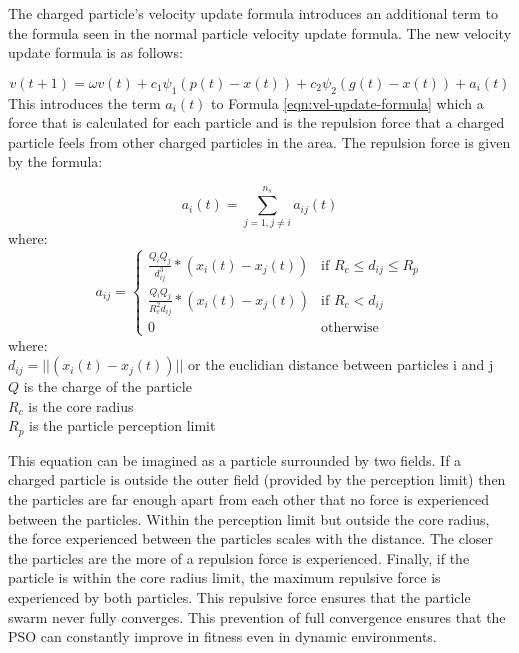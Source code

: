 The charged particle's velocity update formula introduces an additional term to the formula seen in the normal particle velocity update formula. The new velocity update formula is as follows:

\begin{equation} \label{eqn:charged-vel-update}
 v(t+1) = \omega v(t) + c_1\psi_1 (p(t) - x(t)) + c_2 \psi_2  (g(t) - x(t)) + a_i(t)
\end{equation} This introduces the term $a_i(t)$ to Formula \ref{eqn:vel-update-formula} which a force that is calculated for each particle and is the repulsion force that a charged particle feels from other charged particles in the area. The repulsion force is given by the formula:

\begin{equation} \label{eqn:a-def}
 a_i(t) = \sum_{j=1, j\neq i}^{n_s} a_{ij}(t)
\end{equation}where:
 \begin{equation}\label{eq:a-rules}
a_{ij} = 
    \begin{cases}  
    \frac{Q_{i}Q_{j}}{d_{ij}^3} * (x_{i}(t)-x_{j}(t)) & \text{if  $R_{c} \leq d_{ij} \leq R_{p}$}\\ 
    \frac{ Q_{i}Q_{j} }{R_c^2 d_{ij}}*(x_{i}(t)-x_{j}(t)) & \text{if  $R_{c} < d_{ij}$}\\ 
    0 & \text{otherwise}
    \end{cases}
\end{equation}
where:\\
\indent $d_{ij} = ||(x_{i}(t)-x_{j}(t))||$ or the euclidian distance between particles i and j\\
\indent $Q$ is the charge of the particle \\
\indent $R_{c}$ is the core radius \\
\indent $R_{p}$ is the particle perception limit

This equation can be imagined as a particle surrounded by two fields. If a charged particle is outside the outer field (provided by the perception limit) then the particles are far enough apart from each other that no force is experienced between the particles. Within the perception limit but outside the core radius, the force experienced between the particles scales with the distance. The closer the particles are the more of a repulsion force is experienced. Finally, if the particle is within the core radius limit, the maximum repulsive force is experienced by both particles. This repulsive force ensures that the particle swarm never fully converges. This prevention of full convergence ensures that the PSO can constantly improve in fitness even in dynamic environments.

